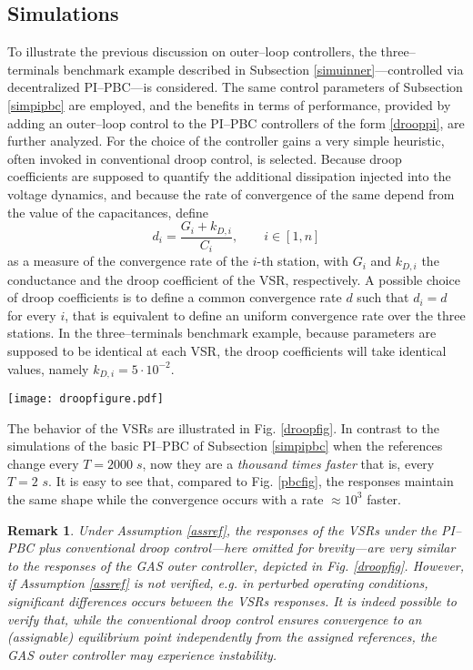 \documentclass[5p,twocolumn]{elsarticle}
\def\begrem{\begin{remark}\rm}
\def\endrem{\end{remark}}
\newtheorem{remark}[theorem]{Remark}
\numberwithin{equation}{section}
\begin{document}
\subsection{Simulations}
\label{simudroop}

To illustrate the previous discussion on outer--loop controllers, the three--terminals benchmark example described in Subsection \ref{simuinner}---controlled via decentralized PI--PBC---is considered. The same control parameters of Subsection \ref{simpipbc} are employed, and the benefits in terms of performance, provided by adding an outer--loop control to the PI--PBC controllers of the form \eqref{drooppi}, are further analyzed. For the choice of the controller gains a very simple heuristic, often invoked in conventional droop control, is selected. Because droop coefficients are supposed to quantify the  additional dissipation injected into the voltage dynamics, and because the rate of convergence of the same depend from the value of the capacitances, define
\begin{equation}\label{Kdroop}
d_i=\frac{G_i+k_{D,i}}{C_i},\qquad i\in[1,n]
\end{equation}
as a measure of the convergence rate of the $i$-th station, with $G_{i}$ and $k_{D,i}$ the conductance and the droop coefficient of the VSR, respectively. A possible choice of droop coefficients is to define a common convergence rate $d$ such that $d_i=d$ for every $i$, that is equivalent to define an uniform convergence rate over the three stations. In the three--terminals benchmark example, because parameters are supposed to be identical at each VSR, the droop coefficients will take identical values, namely $k_{D,i}=5\cdot 10^{-2}$.
\begin{figure*}[ht]
 \centering
 \texttt{[image: droopfigure.pdf]}
\caption{{Responses of VSRs variables with the decentralized PI--PBC plus GAS outer controller.}}
 \label{droopfig}
\end{figure*}
The behavior of the VSRs are illustrated in Fig. \ref{droopfig}. In contrast to the simulations of the basic PI--PBC of Subsection \ref{simpipbc} when the references change every $T=2000\;s$, now they are a {\em thousand times faster} that is, every $T=2$ $s$. It is easy to see that, compared to Fig. \ref{pbcfig}, the responses maintain the same shape while the convergence occurs with a rate $\approx 10^3$ faster.


\begrem
Under Assumption \ref{assref}, the responses of the VSRs under the PI--PBC plus conventional droop control---here omitted for brevity---are very similar to the responses of the GAS outer controller, depicted in Fig. \ref{droopfig}. However, if Assumption \ref{assref} is not verified, \textit{e.g.} in perturbed operating conditions, significant differences occurs between the VSRs responses. It is indeed possible to verify that, while the conventional droop control ensures convergence to an (assignable) equilibrium point independently from the assigned references, the GAS outer controller may experience instability.
\endrem
\end{document}
